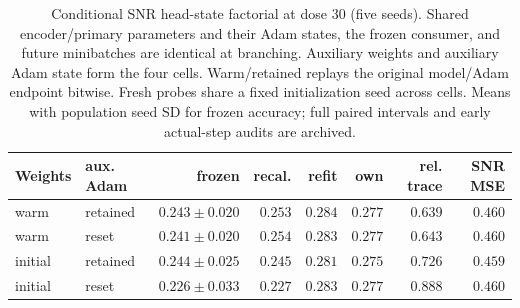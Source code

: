 \begin{table}[t]
\centering
\caption{Conditional SNR head-state factorial at dose $30$ (five seeds). Shared encoder/primary parameters and their Adam states, the frozen consumer, and future minibatches are identical at branching. Auxiliary weights and auxiliary Adam state form the four cells. Warm/retained replays the original model/Adam endpoint bitwise. Fresh probes share a fixed initialization seed across cells. Means with population seed SD for frozen accuracy; full paired intervals and early actual-step audits are archived.}
\label{tab:head_state}
\footnotesize
\begin{tabular}{llrrrrrr}
\toprule
Weights & aux. Adam & frozen & recal. & refit & own & rel. trace & SNR MSE \\
\midrule
warm & retained & $0.243\pm0.020$ & $0.253$ & $0.284$ & $0.277$ & $0.639$ & $0.460$ \\
warm & reset & $0.241\pm0.020$ & $0.254$ & $0.283$ & $0.277$ & $0.643$ & $0.460$ \\
initial & retained & $0.244\pm0.025$ & $0.245$ & $0.281$ & $0.275$ & $0.726$ & $0.459$ \\
initial & reset & $0.226\pm0.033$ & $0.227$ & $0.283$ & $0.277$ & $0.888$ & $0.460$ \\
\bottomrule
\end{tabular}
\end{table}
